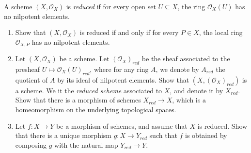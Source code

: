 \begin{exercise}
	A scheme $(X, \mathscr{O}_X) $ is \textit{reduced} if for every open set $U \subseteq X $, the ring $\mathscr{O}_X(U) $ has no nilpotent elements.
	\begin{enumerate}
		\item Show that $(X, \mathscr{O}_X) $ is reduced if and only if for every $P \in X$, the local ring $\mathscr{O}_{X,P} $ has no nilpotent elements.
		\item Let $(X, \mathscr{O}_X) $ be a scheme. Let $(\mathscr{O}_X)_{red} $ be the sheaf associated to the presheaf $U\mapsto \mathscr{O}_X(U)_{red} $, where for any ring $A $, we denote by $A_{red} $ the quotient of $A $ by its ideal of nilpotent elements. Show that $(X, (\mathscr{O}_X)_{red})$ is a scheme. We it the \textit{reduced scheme} associated to $X $, and denote it by $X_{red} $. Show that there is a morphism of schemes $X_{red}\to X $, which is a homeomorphism on the underlying topological spaces.
		\item Let $f: X\to Y $ be a morphism of schemes, and assume that $X $ is reduced. Show that there is a unique morphism $g: X\to Y_{red} $ such that $f $ is obtained by composing $g $ with the natural map $Y_{red}\to Y $.
	\end{enumerate}
\end{exercise}
